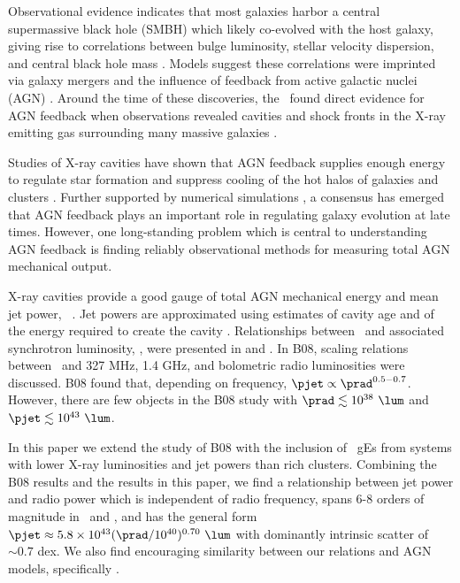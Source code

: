 \documentclass{emulateapj}
\begin{document}
Observational evidence indicates that most galaxies harbor a central
supermassive black hole (SMBH) which likely co-evolved with the host
galaxy, giving rise to correlations between bulge luminosity, stellar
velocity dispersion, and central black hole mass
\citep{1995ARA&A..33..581K, magorrian}. Models suggest these
correlations were imprinted via galaxy mergers and the influence of
feedback from active galactic nuclei (AGN)
\citep[\eg][]{1998A&A...331L...1S, 2000MNRAS.311..576K}. Around the
time of these discoveries, the \cxo\ found direct evidence for AGN
feedback when observations revealed cavities and shock fronts in the
X-ray emitting gas surrounding many massive galaxies
\citep[\eg][]{2000ApJ...534L.135M, perseus1,
  2007ApJ...665.1057F}.

Studies of X-ray cavities have shown that AGN feedback supplies enough
energy to regulate star formation and suppress cooling of the hot
halos of galaxies and clusters \citep{birzan04, 2005MNRAS.364.1343D,
  rafferty06}. Further supported by numerical simulations
\citep[\eg][]{croton06, bower06}, a consensus has emerged that AGN
feedback plays an important role in regulating galaxy evolution at
late times. However, one long-standing problem which is central to
understanding AGN feedback is finding reliably observational methods
for measuring total AGN mechanical output.

X-ray cavities provide a good gauge of total AGN mechanical energy and
mean jet power, \pjet\ \citep{2000ApJ...534L.135M}. Jet powers are
approximated using estimates of cavity age and of the energy required
to create the cavity \citep{2001ApJ...554..261C,
  mcnamrev}. Relationships between \pjet\ and associated synchrotron
luminosity, \prad, were presented in \citet[][hereafter B04]{birzan04}
and \citet[][hereafter B08]{birzan08}. In B08, scaling relations
between \pjet\ and 327 MHz, 1.4 GHz, and bolometric radio luminosities
were discussed. B08 found that, depending on frequency, $\pjet \propto
\prad^{0.5-0.7}$. However, there are few objects in the B08 study with
$\prad \lesssim 10^{38} ~\lum$ and $\pjet \lesssim 10^{43} ~\lum$.

In this paper we extend the study of B08 with the inclusion of
\samp\ gEs from systems with lower X-ray luminosities and jet powers
than rich clusters. Combining the B08 results and the results in this
paper, we find a relationship between jet power and radio power which
is independent of radio frequency, spans 6-8 orders of magnitude in
\pjet\ and \prad, and has the general form $\pjet \approx 5.8 \times
10^{43} (\prad/10^{40})^{0.70} ~\lum$ with dominantly intrinsic
scatter of $\sim 0.7$ dex. We also find encouraging similarity between
our relations and AGN models, specifically \citet{w99}.
\end{document}
